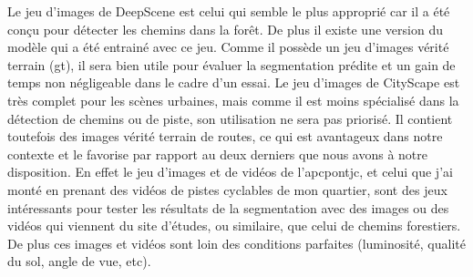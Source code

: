 ﻿\noindent Le jeu d'images de DeepScene est celui qui semble le plus approprié car il a été conçu pour détecter les chemins dans la forêt. De plus il existe une version du modèle qui a été entrainé avec ce jeu. Comme il possède un jeu d'images vérité terrain (\acrshort{gt}), il sera bien utile pour évaluer la segmentation prédite et un gain de temps non négligeable dans le cadre d'un essai. Le jeu d'images de CityScape est très complet pour les scènes urbaines, mais comme il est moins spécialisé dans la détection de chemins ou de piste, son utilisation ne sera pas priorisé. Il contient toutefois des images vérité terrain de routes, ce qui est avantageux dans notre contexte et le favorise par rapport au deux derniers que nous avons à notre disposition. En effet le jeu d'images et de vidéos de l'\acrshort{apcpontjc}, et celui que j'ai monté en prenant des vidéos de pistes cyclables de mon quartier, sont des jeux intéressants pour tester les résultats de la segmentation avec des images ou des vidéos qui viennent du site d'études, ou similaire, que celui de chemins forestiers. De plus ces images et vidéos sont loin des conditions parfaites (luminosité, qualité du sol, angle de vue, etc).
